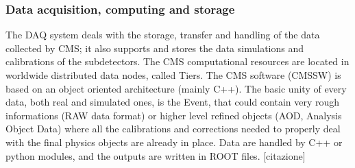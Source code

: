 \subsubsection{Data acquisition, computing and storage}
The DAQ system deals with the storage, transfer and handling of the data collected by CMS; it also supports and stores the data simulations and calibrations of the subdetectors. The CMS computational resources are located in worldwide distributed data nodes, called Tiers. The CMS software (CMSSW) is based on an object oriented architecture (mainly C++). The basic unity of every data, both real and simulated ones, is the Event, that could contain very rough informations (RAW data format) or higher level refined objects (AOD, Analysis Object Data) where all the calibrations and corrections needed to properly deal with the final physics objects are already in place. Data are handled by C++ or python modules, and the outputs are written in ROOT files. [citazione]

